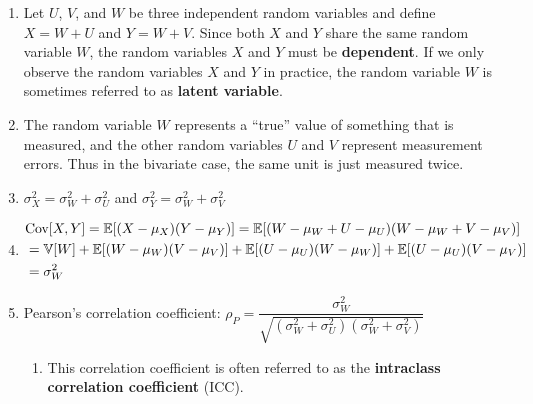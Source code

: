 \begin{enumerate}
    \item Let $U$, $V$, and $W$ be three independent random variables and define $X = W + U$ and $Y = W + V$.
    Since both $X$ and $Y$ share the same random variable $W$, the random variables $X$ and $Y$ must be \textbf{dependent}.
    If we only observe the random variables $X$ and $Y$ in practice, the random variable $W$ is sometimes referred to as \textbf{latent variable}.
    \hfill \cite{statistics/book/Statistics-for-Data-Scientists/Maurits-Kaptein}

    \item The random variable $W$ represents a “true” value of something that is measured, and the other random variables $U$ and $V$ represent measurement errors.
    Thus in the bivariate case, the same unit is just measured twice.
    \hfill \cite{statistics/book/Statistics-for-Data-Scientists/Maurits-Kaptein}

    \item $\sigma^2_X = \sigma^2_W + \sigma^2_U$ and $\sigma^2_Y = \sigma^2_W + \sigma^2_V$
    \hfill \cite{statistics/book/Statistics-for-Data-Scientists/Maurits-Kaptein}

    \item 
    $
        \begin{aligned}
            &\text{Cov}[X, Y] 
            = \mathbb{E}[(X - \mu_X )(Y - \mu_Y )]
            = \mathbb{E}[(W - \mu_W + U - \mu_U )(W - \mu_W + V - \mu_V )] \\
            &= \mathbb{V}[W] + \mathbb{E}[(W - \mu_W )(V - \mu_V )] + \mathbb{E}[(U - \mu_U )(W - \mu_W )] + \mathbb{E}[(U - \mu_U )(V - \mu_V )] \\
            &= \sigma^2_W
        \end{aligned}
    $
    \hfill \cite{statistics/book/Statistics-for-Data-Scientists/Maurits-Kaptein}

    \item Pearson’s correlation coefficient: 
    $
        \rho_P 
        = \dfrac{\sigma^2_W }{\sqrt{(\sigma^2_W + \sigma^2_U )(\sigma^2_W + \sigma^2_V )}}
    $
    \hfill \cite{statistics/book/Statistics-for-Data-Scientists/Maurits-Kaptein}
    \begin{enumerate}
        \item This correlation coefficient is often referred to as the \textbf{intraclass correlation coefficient} (ICC).
        \hfill \cite{statistics/book/Statistics-for-Data-Scientists/Maurits-Kaptein}
    \end{enumerate}
\end{enumerate}


